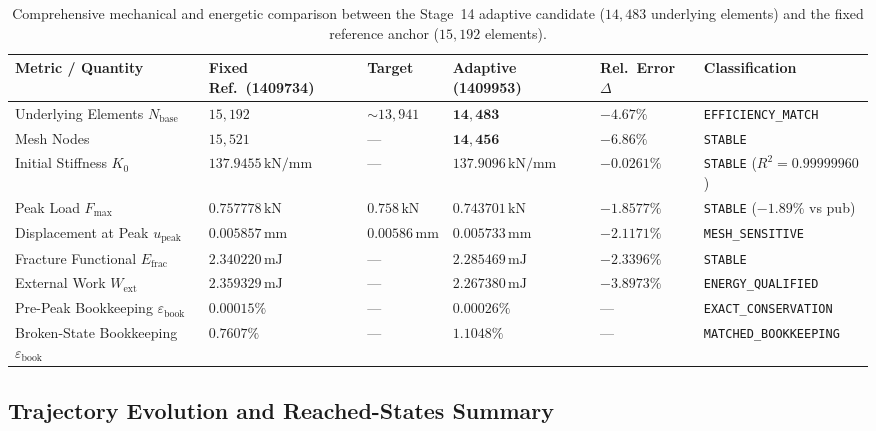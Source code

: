 \begin{table}[htbp]
\centering
\small
\caption{Comprehensive mechanical and energetic comparison between the Stage~14 adaptive candidate ($14,483$ underlying elements) and the fixed reference anchor ($15,192$ elements).}
\label{tab:stage14s_parity_matrix}
\begin{tabularx}{\textwidth}{p{4.2cm} p{2.1cm} p{2.1cm} p{2.1cm} p{1.8cm} X}
\toprule
\textbf{Metric / Quantity} & \textbf{Fixed Ref.\ (1409734)} & \textbf{Target \citep{pandey2025}} & \textbf{Adaptive (1409953)} & \textbf{Rel.\ Error $\Delta$} & \textbf{Classification} \\
\midrule
Underlying Elements $N_{\mathrm{base}}$ & $15,192$ & ${\sim}13{,}941$ & $\mathbf{14,483}$ & $-4.67\%$ & \texttt{EFFICIENCY\_MATCH} \\
Mesh Nodes & $15,521$ & — & $\mathbf{14,456}$ & $-6.86\%$ & \texttt{STABLE} \\
Initial Stiffness $K_0$ & $137.9455\,\mathrm{kN/mm}$ & — & $\mathbf{137.9096\,\mathrm{kN/mm}}$ & $\mathbf{-0.0261\%}$ & \texttt{STABLE} ($R^2=0.99999960$) \\
Peak Load $F_{\max}$ & $0.757778\,\mathrm{kN}$ & $0.758\,\mathrm{kN}$ & $\mathbf{0.743701\,\mathrm{kN}}$ & $\mathbf{-1.8577\%}$ & \texttt{STABLE} ($-1.89\%$ vs pub) \\
Displacement at Peak $u_{\mathrm{peak}}$ & $0.005857\,\mathrm{mm}$ & $0.00586\,\mathrm{mm}$ & $\mathbf{0.005733\,\mathrm{mm}}$ & $-2.1171\%$ & \texttt{MESH\_SENSITIVE} \\
Fracture Functional $E_{\mathrm{frac}}$ & $2.340220\,\mathrm{mJ}$ & — & $\mathbf{2.285469\,\mathrm{mJ}}$ & $\mathbf{-2.3396\%}$ & \texttt{STABLE} \\
External Work $W_{\mathrm{ext}}$ & $2.359329\,\mathrm{mJ}$ & — & $\mathbf{2.267380\,\mathrm{mJ}}$ & $-3.8973\%$ & \texttt{ENERGY\_QUALIFIED} \\
Pre-Peak Bookkeeping $\varepsilon_{\mathrm{book}}$ & $0.00015\%$ & — & $\mathbf{0.00026\%}$ & — & \texttt{EXACT\_CONSERVATION} \\
Broken-State Bookkeeping $\varepsilon_{\mathrm{book}}$ & $0.7607\%$ & — & $\mathbf{1.1048\%}$ & — & \texttt{MATCHED\_BOOKKEEPING} \\
\bottomrule
\end{tabularx}
\end{table}

\subsection{Trajectory Evolution and Reached-States Summary}
\label{subsec:stage14s_matched_states}

